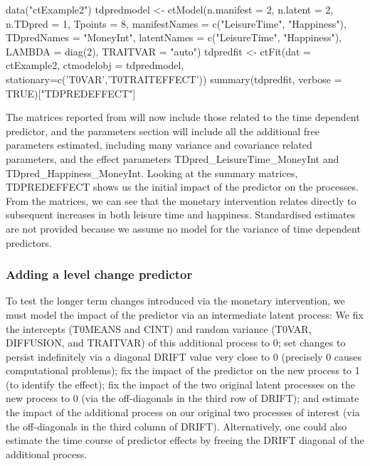 \documentclass[nojss]{jss}\usepackage[]{graphicx}\usepackage[]{color}
\begin{document}
\begin{Schunk}
\begin{Sinput}
data("ctExample2")
tdpredmodel <- ctModel(n.manifest = 2, n.latent = 2, n.TDpred = 1, 
  Tpoints = 8, manifestNames = c("LeisureTime", "Happiness"), 
  TDpredNames = "MoneyInt", latentNames = c("LeisureTime", "Happiness"),
  LAMBDA = diag(2), TRAITVAR = "auto")
tdpredfit <- ctFit(dat = ctExample2, ctmodelobj = tdpredmodel,
  stationary=c('T0VAR','T0TRAITEFFECT'))
summary(tdpredfit, verbose = TRUE)["TDPREDEFFECT"]
\end{Sinput}
\end{Schunk}


The matrices reported from  will now include those related to the time dependent predictor, and the parameters section will include all the additional free parameters estimated, including many variance and covariance related parameters, and the effect parameters TDpred\_LeisureTime\_MoneyInt and TDpred\_Happiness\_MoneyInt.  Looking at the summary matrices, TDPREDEFFECT shows us the initial impact of the predictor on the processes.  From the matrices, we can see that the monetary intervention relates directly to subsequent increases in both leisure time and happiness. Standardised estimates are not provided because we assume no model for the variance of time dependent predictors.

\subsubsection{Adding a level change predictor}\nopagebreak
To test the longer term changes introduced via the monetary intervention, we must model the impact of the predictor via an intermediate latent process: We fix the intercepts (T0MEANS and CINT) and random variance (T0VAR, DIFFUSION, and TRAITVAR) of this additional process to 0; set changes to persist indefinitely via a diagonal DRIFT value very close to 0 (precisely 0 causes computational problems); fix the impact of the predictor on the new process to 1 (to identify the effect); fix the impact of the two original latent processes on the new process to 0 (via the off-diagonals in the third row of DRIFT); and estimate the impact of the additional process on our original two processes of interest (via the off-diagonals in the third column of DRIFT). Alternatively, one could also estimate the time course of predictor effects by freeing the DRIFT diagonal of the additional process. 
\end{document}
